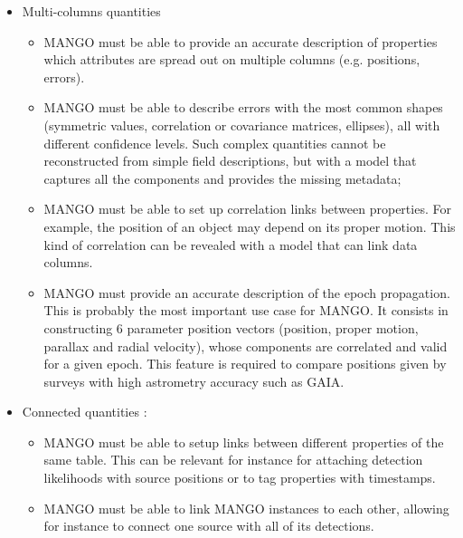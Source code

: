 \documentclass[11pt,a4paper]{ivoa}
\begin{document}
\begin{itemize}
    \item Multi-columns quantities
       \begin{itemize}[noitemsep,topsep=0pt,parsep=0pt,partopsep=0pt]
          \item MANGO must be able to provide an accurate description of properties which attributes are spread 
                out on multiple columns (e.g. positions, errors).
          \item MANGO must be able to describe errors with the most common shapes (symmetric values, correlation 
                or covariance matrices, ellipses), all with different confidence levels. 
                Such complex quantities cannot be reconstructed from simple field descriptions, but with a model
                that captures all the components and provides the missing metadata;
          \item MANGO must be able to set up correlation links between properties. For example,
                the position of an object may depend on its proper motion. This kind of correlation can be revealed 
                with a model that can link data columns.
          \item MANGO must provide an accurate description of the epoch propagation. 
                This is probably the most important use case for MANGO. It consists in constructing 6 parameter 
                position vectors (position, proper motion, parallax and radial velocity), whose components are 			
                correlated and valid for a given epoch. 
                This feature is required to compare positions given by surveys with high astrometry accuracy such as GAIA.
       \end{itemize} 
         
    \item Connected quantities : 
       \begin{itemize}[noitemsep,topsep=0pt,parsep=0pt,partopsep=0pt]
           \item MANGO must be able to setup links between different properties of the same table. 
                 This can be relevant for instance for attaching detection likelihoods with source positions
                 or to tag properties with timestamps.
           \item MANGO must be able to link MANGO instances to each other, allowing for instance to connect one 
                 source with all of its detections.
        \end{itemize}   
\end{itemize}
\end{document}
